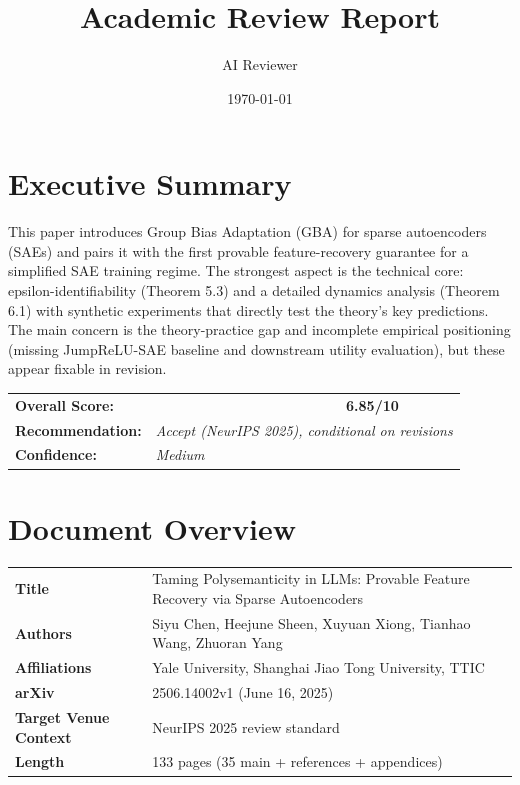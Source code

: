 \documentclass[11pt,a4paper]{article}
\title{\textcolor{textdark}{Academic Review Report}}
\author{AI Reviewer}
\date{\today}
\newcommand{\scorebar}[1]{%
  \begin{tikzpicture}[baseline=-0.5ex]
    \fill[reviewgray!20] (0,0) rectangle (2.5,0.3);
    \ifnum#1>7
      \fill[reviewgreen!60] (0,0) rectangle ({#1*0.25},0.3);
    \else\ifnum#1>4
      \fill[reviewsand!60] (0,0) rectangle ({#1*0.25},0.3);
    \else
      \fill[reviewred!60] (0,0) rectangle ({#1*0.25},0.3);
    \fi\fi
    \draw[reviewgray!40] (0,0) rectangle (2.5,0.3);
  \end{tikzpicture}%
}
\begin{document}
\maketitle

\section{Executive Summary}
This paper introduces Group Bias Adaptation (GBA) for sparse autoencoders (SAEs) and pairs it with the first provable feature-recovery guarantee for a simplified SAE training regime. The strongest aspect is the technical core: epsilon-identifiability (Theorem 5.3) and a detailed dynamics analysis (Theorem 6.1) with synthetic experiments that directly test the theory's key predictions. The main concern is the theory-practice gap and incomplete empirical positioning (missing JumpReLU-SAE baseline and downstream utility evaluation), but these appear fixable in revision.

\begin{insightbox}
\begin{tabular}{lrl}
\textbf{Overall Score:} & \textcolor{reviewsand}{\textbf{6.85/10}} & \scorebar{7} \\
\textbf{Recommendation:} & \multicolumn{2}{l}{\textit{Accept (NeurIPS 2025), conditional on revisions}} \\
\textbf{Confidence:} & \multicolumn{2}{l}{\textit{Medium}} \\
\end{tabular}
\end{insightbox}

\section{Document Overview}
\begin{tabularx}{\textwidth}{>{\bfseries}lX}
Title & Taming Polysemanticity in LLMs: Provable Feature Recovery via Sparse Autoencoders \\
Authors & Siyu Chen, Heejune Sheen, Xuyuan Xiong, Tianhao Wang, Zhuoran Yang \\
Affiliations & Yale University, Shanghai Jiao Tong University, TTIC \\
arXiv & 2506.14002v1 (June 16, 2025) \\
Target Venue Context & NeurIPS 2025 review standard \\
Length & 133 pages (35 main + references + appendices) \\
\end{tabularx}
\end{document}
